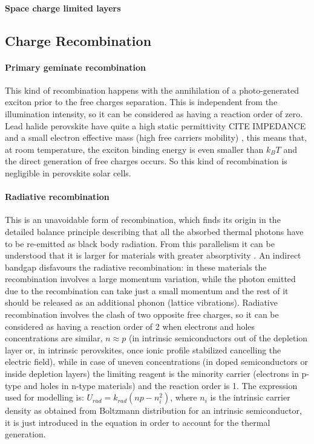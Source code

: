\paragraph{Space charge limited layers}

\subsection{Charge Recombination}

\paragraph{Primary geminate recombination} \label{intro_geminate} This kind of recombination happens with the annihilation of a photo-generated exciton prior to the free charges separation. This is independent from the illumination intensity, so it can be considered as having a reaction order of zero. Lead halide perovskite have quite a high static permittivity CITE IMPEDANCE and a small electron effective mass (high free carriers mobility) \cite{Herz2017}, this means that, at room temperature, the exciton binding energy is even smaller than $k_BT$ \cite{Miyata2015,Galkowski2016} and the direct generation of free charges occurs. So this kind of recombination is negligible in perovskite solar cells. %

\paragraph{Radiative recombination} This is an unavoidable form of recombination, which finds its origin in the detailed balance principle describing that all the absorbed thermal photons have to be re-emitted as black body radiation. From this parallelism it can be understood that it is larger for materials with greater absorptivity \cite{Nelson2003}. An indirect bandgap disfavours the radiative recombination: in these materials the recombination involves a large momentum variation, while the photon emitted due to the recombination can take just a small momentum and the rest of it should be released as an additional phonon (lattice vibrations). Radiative recombination involves the clash of two opposite free charges, so it can be considered as having a reaction order of 2 when electrons and holes concentrations are similar, $n \approx p$ (in intrinsic semiconductors out of the depletion layer or, in intrinsic perovskites, once ionic profile stabilized cancelling the electric field), while in case of uneven concentrations (in doped semiconductors or inside depletion layers) the limiting reagent is the minority carrier (electrons in p-type and holes in n-type materials) and the reaction order is 1. The expression used for modelling is: $U_{rad} = k_{rad} (np-n_i^2)$, where $n_i$ is the intrinsic carrier density as obtained from Boltzmann distribution for an intrinsic semiconductor, it is just introduced in the equation in order to account for the thermal generation.

